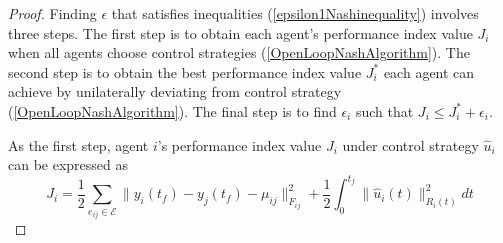 \documentclass[12pt,draftcls,onecolumn]{IEEEtran}  %
\begin{document}
\begin{proof}
Finding $\epsilon$ that satisfies inequalities (\ref{epsilon1Nashinequality}) involves three steps. The first step is to obtain each agent's performance index value $J_i$ when all agents choose control strategies (\ref{OpenLoopNashAlgorithm}). The second step is to obtain the best performance index value $J_i^*$ each agent can achieve by unilaterally deviating from control strategy (\ref{OpenLoopNashAlgorithm}). The final step is to find $\epsilon_i$ such that $J_i\leq J_i^*+\epsilon_i$.

As the first step, agent $i$'s performance index value $J_i$ under control strategy $\hat{u}_i$ can be expressed as
\begin{equation}
J_i=\frac{1}{2}\sum_{e_{ij}\in\mathcal{E}} \|y_i(t_f)-y_j(t_f)-\mu_{ij}\|^2_{F_{ij}} +\frac{1}{2}\int_{0}^{t_f} \|\hat{u}_i(t)\|^2_{R_i(t)}dt \label{JiJistar}
\end{equation}


\end{proof}
\end{document}
